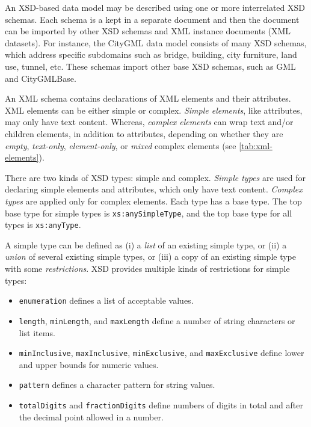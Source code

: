 
An XSD-based data model may be described using one or more interrelated XSD schemas.
Each schema is a kept in a separate document and then the document can be imported by other XSD schemas and XML instance documents (XML datasets).
For instance, the CityGML data model consists of many XSD schemas, which address specific subdomains such as bridge, building, city furniture, land use, tunnel, etc.
These schemas import other base XSD schemas, such as GML and CityGMLBase.



An XML schema contains declarations of XML elements and their attributes.
XML elements can be either simple or complex.
\emph{Simple elements}, like attributes, may only have text content.
Whereas, \emph{complex elements} can wrap text and/or children elements, in addition to attributes, depending on whether they are
\emph{empty}, \emph{text-only}, \emph{element-only}, or \emph{mixed} complex elements (see \autoref{tab:xml-elements}).

There are two kinds of XSD types: simple and complex.
\emph{Simple types} are used for declaring simple elements and attributes, which only have text content.
\emph{Complex types} are applied only for complex elements.
Each type has a base type.
The top base type for simple types is \texttt{xs:anySimpleType}, and the top base type for all types is \texttt{xs:anyType}.

A simple type can be defined as (i) a \emph{list} of an existing simple type, or (ii) a \emph{union} of several existing simple types, or (iii) a copy of an existing simple type with some \emph{restrictions}.
XSD provides multiple kinds of restrictions for simple types:
\begin{itemize}
    \item \texttt{enumeration} defines a list of acceptable values.
    \item \texttt{length}, \texttt{min\-Length}, and \texttt{max\-Length} define a number of string characters or list items.
    \item \texttt{min\-Inclu\-sive}, \texttt{max\-Inclu\-sive}, \texttt{min\-Exclu\-sive}, and \texttt{max\-Exclu\-sive} define lower and upper bounds for numeric values.
    \item \texttt{pattern} defines a character pattern for string values.
    \item \texttt{totalDigits} and \texttt{fractionDigits} define numbers of digits in total and after the decimal point allowed in a number.
\end{itemize}


